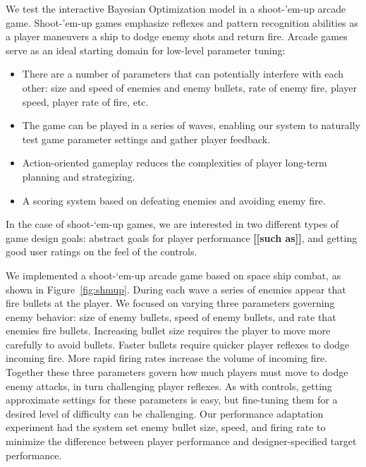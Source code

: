 \documentclass{sig-alternate}
\newcommand{\mytodo}[1]{\textbf{[[#1]]}}
\begin{document}
We test the interactive Bayesian Optimization model in a shoot-'em-up arcade game.
Shoot-'em-up games emphasize reflexes and pattern recognition abilities as a player maneuvers a ship to dodge enemy shots and return fire.
%
Arcade games serve as an ideal starting domain for low-level parameter tuning:
\begin{itemize}
\item There are a number of parameters that can potentially interfere with each other: size and speed of enemies and enemy bullets, rate of enemy fire, player speed, player rate of fire, etc.
\item The game can be played in a series of waves, enabling our system to naturally test game parameter settings and gather player feedback.
\item Action-oriented gameplay reduces the complexities of player long-term planning and strategizing.
\item A scoring system based on defeating enemies and avoiding enemy fire.
\end{itemize}
%
%
In the case of shoot-`em-up games, we are interested in two different types of game design goals: abstract goals for player performance \mytodo{such as}, and getting good user ratings on the feel of the controls.

We implemented a shoot-`em-up arcade game based on space ship combat, as shown in Figure~\ref{fig:shmup}.
During each wave a series of enemies appear that fire bullets at the player. 
We focused on varying three parameters governing enemy behavior: size of enemy bullets, speed of enemy bullets, and rate that enemies fire bullets. Increasing bullet size requires the player to move more carefully to avoid bullets. Faster bullets require quicker player reflexes to dodge incoming fire. More rapid firing rates increase the volume of incoming fire. Together these three parameters govern how much players must move to dodge enemy attacks, in turn challenging player reflexes. As with controls, getting approximate settings for these parameters is easy, but fine-tuning them for a desired level of difficulty can be challenging. Our performance adaptation experiment had the system set enemy bullet size, speed, and firing rate to minimize the difference between player performance and designer-specified target performance.
\end{document}
